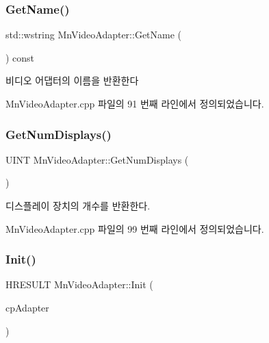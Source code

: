 \mbox{\label{class_m_n_l_1_1_mn_video_adapter_a7c6440afa08007a034c42fd69af97bc0}} 
\subsubsection{\texorpdfstring{Get\+Name()}{GetName()}}
{\footnotesize\ttfamily std\+::wstring Mn\+Video\+Adapter\+::\+Get\+Name (\begin{DoxyParamCaption}{ }\end{DoxyParamCaption}) const}



비디오 어댑터의 이름을 반환한다 



Mn\+Video\+Adapter.\+cpp 파일의 91 번째 라인에서 정의되었습니다.

\mbox{\label{class_m_n_l_1_1_mn_video_adapter_a89622e2450c14827f83cdd0a783da999}} 
\subsubsection{\texorpdfstring{Get\+Num\+Displays()}{GetNumDisplays()}}
{\footnotesize\ttfamily U\+I\+NT Mn\+Video\+Adapter\+::\+Get\+Num\+Displays (\begin{DoxyParamCaption}{ }\end{DoxyParamCaption})}



디스플레이 장치의 개수를 반환한다. 



Mn\+Video\+Adapter.\+cpp 파일의 99 번째 라인에서 정의되었습니다.

\mbox{\label{class_m_n_l_1_1_mn_video_adapter_a32cf49f2fc53369e5ac7db8861a5dd53}} 
\subsubsection{\texorpdfstring{Init()}{Init()}}
{\footnotesize\ttfamily H\+R\+E\+S\+U\+LT Mn\+Video\+Adapter\+::\+Init (\begin{DoxyParamCaption}\item[{\hyperlink{namespace_m_n_l_ab0e24805043a50c45364c389f8929f33}{C\+P\+D\+X\+G\+I\+Adapter}}]{cp\+Adapter }\end{DoxyParamCaption})}



